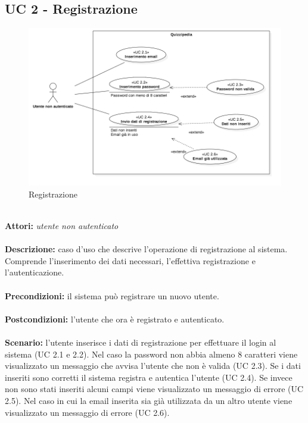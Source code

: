 \documentclass[a4paper,11pt]{article}
\begin{document}
\newpage
\subsection{UC 2 - Registrazione}

\begin{figure}[h!]
\centering
\includegraphics[scale=0.6]{../immagini/UC2.png}
\caption{Registrazione}
\end{figure}
\ \\
\textbf{Attori:} \textit{utente non autenticato}
\\ \\
\textbf{Descrizione:} caso d'uso che descrive l'operazione di registrazione al sistema. Comprende l'inserimento dei dati necessari, l'effettiva registrazione e l'autenticazione.\\
\\
\textbf{Precondizioni:} il sistema può registrare un nuovo utente.\\
\\
\textbf{Postcondizioni:} l’utente che ora è registrato e autenticato.\\
\\
\textbf{Scenario:} l’utente inserisce i dati di registrazione per effettuare il login al sistema (UC 2.1 e 2.2). Nel caso la password non abbia almeno 8 caratteri viene visualizzato un messaggio che avvisa l'utente che non è valida (UC 2.3). Se i dati inseriti sono corretti il sistema registra e autentica l'utente (UC 2.4). Se invece non sono stati inseriti alcuni campi viene visualizzato un messaggio di errore (UC 2.5). Nel caso in cui la email inserita sia già utilizzata da un altro utente viene visualizzato un messaggio di errore (UC 2.6).\\
\end{document}
